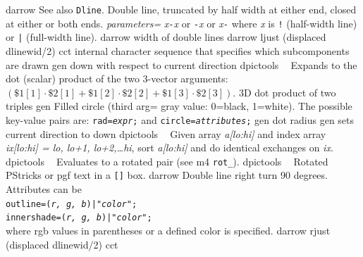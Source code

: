   {darrow}%
  {See also {\tt Dline}.
   Double line, truncated by half width at either end, closed
    at either or both ends.
   {\sl parameters=}
      {\sl x}{\tt -}{\sl x} or
      {\tt -}{\sl x} or
      {\sl x}{\tt -} where {\sl x} is {\tt !} (half-width line)
       or {\tt |} (full-width line).}%
%
  {darrow}%
  {width of double lines}%
%
  {darrow}%
  {ljust (displaced dlinewid/2)}%
%
  {cct}%
  {internal character sequence that specifies which subcomponents are drawn}%
%
  {gen}%
  {down with respect to current direction}%
%
  {dpictools}%
  {$\;\;$ Expands to the dot (scalar) product of the two 3-vector arguments:
   $(\${}1[1]\cdot\${}2[1] + \${}1[2]\cdot\${}2[2] + \${}1[3]\cdot\${}2[3])$.}%
%
  {3D}%
  {dot product of two triples}%
%
  {gen}%
  {Filled circle (third arg= gray value: 0=black, 1=white). The possible
   key-value pairs are:
    {\tt rad={\sl expr};} and
    {\tt circle={\sl attributes};} }%
%
  {gen}%
  {dot radius}%
%
  {gen}%
  {sets current direction to down }%
%
  {dpictools}%
  {$\;\;$ Given array {\sl a[lo:hi]} and index array {\sl ix[lo:hi] =
    lo, lo+1, lo+2,\ldots hi}, sort {\sl a[lo:hi]} and do identical exchanges
    on {\sl ix}.}%
%
  {dpictools}%
  {$\;\;$ Evaluates to a rotated pair (see m4 {\tt rot\_}).}%
%
  {dpictools}%
  {$\;\;$ Rotated PStricks or pgf text in a {\tt []} box.}%
%
  {darrow}%
  {Double line right turn 90 degrees.  Attributes can be\\
    {\tt outline=({\sl r, g, b})|"{\sl color}";}\\
    {\tt innershade=({\sl r, g, b})|"{\sl color}";}\\
    where rgb values in parentheses or a defined color is specified.}%
%
  {darrow}%
  {rjust (displaced dlinewid/2)}%
%
  {cct}%
